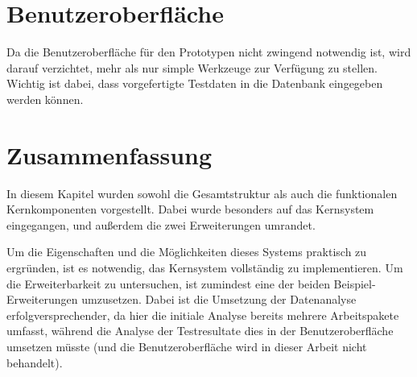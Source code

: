 \section{Benutzeroberfläche}
\label{sec:design:ui}

Da die Benutzeroberfläche für den Prototypen nicht zwingend notwendig ist,
wird darauf verzichtet, mehr als nur simple Werkzeuge zur Verfügung zu stellen.
Wichtig ist dabei, dass vorgefertigte Testdaten in die Datenbank eingegeben werden können.


\section{Zusammenfassung}
\label{sec:design:zusammenfassung}

In diesem Kapitel wurden sowohl die Gesamtstruktur als auch die funktionalen Kernkomponenten vorgestellt.
Dabei wurde besonders auf das Kernsystem eingegangen,
und außerdem die zwei Erweiterungen umrandet.

Um die Eigenschaften und die Möglichkeiten dieses Systems praktisch zu ergründen, ist es notwendig, das Kernsystem vollständig zu implementieren.
Um die Erweiterbarkeit zu untersuchen, ist zumindest eine der beiden Beispiel-Erweiterungen umzusetzen. Dabei ist die Umsetzung
der Datenanalyse erfolgversprechender, da hier die initiale Analyse bereits mehrere Arbeitspakete umfasst, während die Analyse der Testresultate dies in der Benutzeroberfläche umsetzen müsste (und die Benutzeroberfläche wird in dieser Arbeit nicht behandelt).
